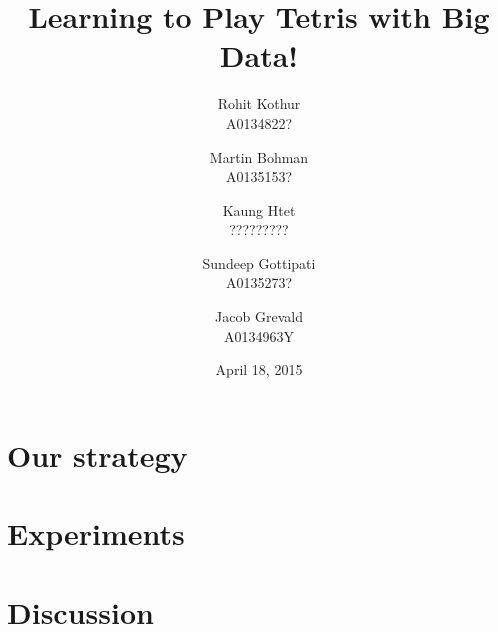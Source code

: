 \documentclass[12pt,twocolumn]{article}
\title{Learning to Play Tetris with Big Data!}
\author{
	Rohit Kothur \\ A0134822? \and
	Martin Bohman \\ A0135153? \and
	Kaung Htet \\ ????????? \and \quad
	Sundeep Gottipati \\ A0135273? \and
	Jacob Grevald \\ A0134963Y}
\date{April 18, 2015}
\begin{document}
\maketitle

\section*{Our strategy}

\section*{Experiments}

\section*{Discussion}
\end{document}
